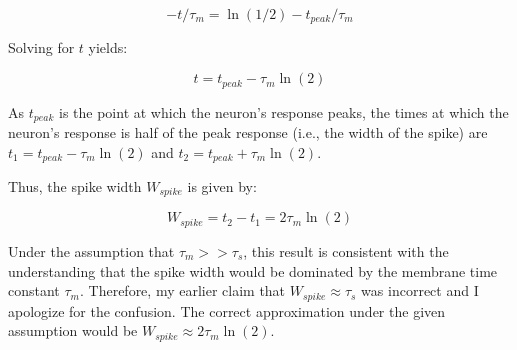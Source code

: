 \begin{equation}
-t/\tau_m = \ln(1/2) - t_{peak}/\tau_m
\end{equation}

Solving for $t$ yields:

\begin{equation}
t = t_{peak} - \tau_m \ln(2)
\end{equation}

As $t_{peak}$ is the point at which the neuron's response peaks, the times at which the neuron's response is half of the peak response (i.e., the width of the spike) are $t_1 = t_{peak} - \tau_m \ln(2)$ and $t_2 = t_{peak} + \tau_m \ln(2)$.

Thus, the spike width $W_{spike}$ is given by:

\begin{equation}
W_{spike} = t_2 - t_1 = 2\tau_m \ln(2)
\end{equation}

Under the assumption that $\tau_m >> \tau_s$, this result is consistent with the understanding that the spike width would be dominated by the membrane time constant $\tau_m$. Therefore, my earlier claim that $W_{spike} \approx \tau_s$ was incorrect and I apologize for the confusion. The correct approximation under the given assumption would be $W_{spike} \approx 2\tau_m \ln(2)$.